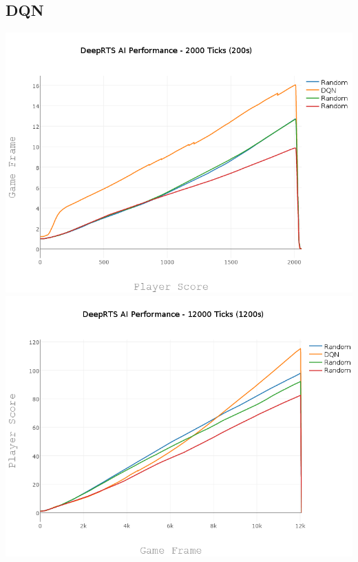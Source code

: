 \documentclass[fleqn,10pt]{article} %
\begin{document}
\subsection{DQN}
\includegraphics[width=\linewidth]{3000.png}
\includegraphics[width=\linewidth]{12000.png}
\end{document}
